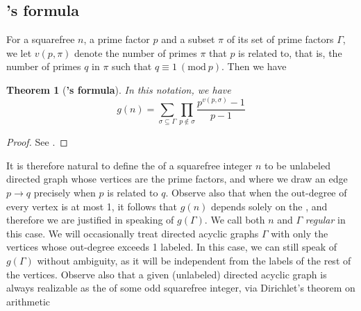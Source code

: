\documentclass[draft]{article}
\newcommand{\Mod}[1]{\ (\mathrm{mod} \ #1)}
\theoremstyle{plain}
\newtheorem{fact}{Theorem}[section]
\theoremstyle{definition}
\begin{document}
\section{\hgs[1]}
\subsection{\hold[1]'s formula}
For a squarefree $n$, a prime factor $p$ and a subset $\pi$ of its set of prime factors $\Gamma$, we let $v(p, \pi)$ denote the number of primes $\pi$ that $p$ is related to, that is, the number of primes $q$ in $\pi$ such that $q \equiv 1 \Mod{p}$. Then we have
\begin{fact}[\textbf{\hold[1]'s formula}] In this notation, we have
	\begin{equation*}
		g(n) = \sum_{\sigma \subseteq \Gamma} \prod_{p \notin \sigma} \frac{p^{v(p, \sigma)} - 1}{p - 1}
	\end{equation*}
\end{fact}
\begin{proof} See {\cite{gnumoas}}. \end{proof}

It is therefore natural to define the \emph{\hg[1]} of a squarefree integer $n$ to be unlabeled directed graph whose vertices are the prime factors, and where we draw an edge $p \rightarrow q$ precisely when $p$ is related to $q$. Observe also that when the out-degree of every vertex is at most 1, it follows that $g(n)$ depends solely on the \hg[1], and therefore we are justified in speaking of $g(\Gamma).$ We call both $n$ and $\Gamma$ \emph{regular} in this case. We will occasionally treat directed acyclic graphs $\Gamma$ with only the vertices whose out-degree exceeds 1 labeled. In this case, we can still speak of $g(\Gamma)$ without ambiguity, as it will be independent from the labels of the rest of the vertices. Observe also that a given (unlabeled) directed acyclic graph is always realizable as the \hg[1] of some odd squarefree integer, via Dirichlet's theorem on arithmetic
\end{document}
